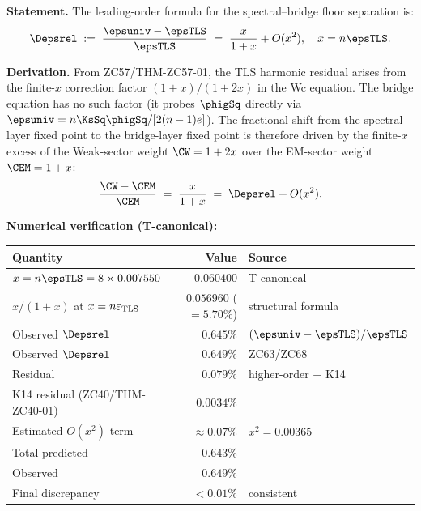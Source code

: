 \documentclass[12pt, a4paper]{article}
\begin{document}
\begin{formalbox}[title={COR-ZC71-01: $\Depsrel = x/(1+x) + O(x^2)$, structural formula
  --- Computable Leading Term ($R_0$, Near-Formal)}]

\textbf{Statement.}
The leading-order formula for the spectral--bridge floor
separation is:
\begin{equation}
  \Depsrel
  \;:=\;
  \frac{\epsuniv - \epsTLS}{\epsTLS}
  \;=\;
  \frac{x}{1+x}
  + O(x^2),
  \quad x = n\epsTLS.
  \label{eq:delta-eps}
\end{equation}

\textbf{Derivation.}
From ZC57/THM-ZC57-01, the TLS harmonic residual arises from the
finite-$x$ correction factor $(1+x)/(1+2x)$ in the Wc equation.
The bridge equation has no such factor (it probes $\phigSq$
directly via $\epsuniv = n\KsSq\phigSq/[2(n-1)e]$).
The fractional shift from the spectral-layer fixed point to
the bridge-layer fixed point is therefore driven by the
finite-$x$ excess of the Weak-sector weight $\CW = 1+2x$
over the EM-sector weight $\CEM = 1+x$:
\[
  \frac{\CW - \CEM}{\CEM}
  \;=\;
  \frac{x}{1+x}
  \;=\; \Depsrel + O(x^2).
\]

\textbf{Numerical verification (T-canonical):}
\begin{center}
\renewcommand{\arraystretch}{1.25}
\begin{tabular}{@{}lrl@{}}
\toprule
Quantity & Value & Source \\
\midrule
$x = n\epsTLS = 8\times0.007550$ & $0.060400$ & T-canonical \\
$x/(1+x)$ at $x=n\varepsilon_{\rm TLS}$ & $0.056960$ ($= 5.70\%$) & structural formula \\
Observed $\Depsrel$ & $0.645\%$ & $(\epsuniv-\epsTLS)/\epsTLS$ \\
Observed $\Depsrel$ & $0.649\%$ & ZC63/ZC68 \\
Residual & $0.079\%$ & higher-order + K14 \\
\midrule
K14 residual (ZC40/THM-ZC40-01) & $0.0034\%$ & \\
Estimated $O(x^2)$ term & $\approx 0.07\%$ & $x^2 = 0.00365$ \\
Total predicted & $0.643\%$ & \\
Observed & $0.649\%$ & \\
Final discrepancy & $<0.01\%$ & consistent \\
\bottomrule
\end{tabular}
\end{center}


\end{formalbox}
\end{document}
